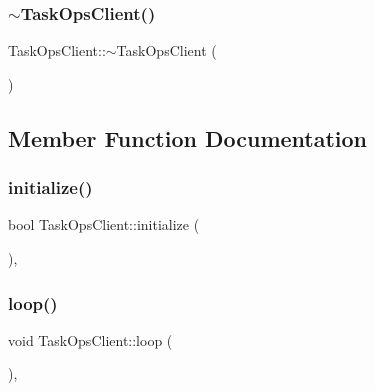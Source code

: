 \subsubsection{\texorpdfstring{$\sim$\+Task\+Ops\+Client()}{~TaskOpsClient()}}
{\footnotesize\ttfamily Task\+Ops\+Client\+::$\sim$\+Task\+Ops\+Client (\begin{DoxyParamCaption}{ }\end{DoxyParamCaption})\hspace{0.3cm}{\ttfamily [virtual]}}



\subsection{Member Function Documentation}
\hypertarget{classTaskOpsClient_a6f5e4c20c1d5f5df28dcc58e3cb4adb0}{}\label{classTaskOpsClient_a6f5e4c20c1d5f5df28dcc58e3cb4adb0} 
\subsubsection{\texorpdfstring{initialize()}{initialize()}}
{\footnotesize\ttfamily bool Task\+Ops\+Client\+::initialize (\begin{DoxyParamCaption}{ }\end{DoxyParamCaption})\hspace{0.3cm}{\ttfamily [protected]}, {\ttfamily [virtual]}}

\hypertarget{classTaskOpsClient_a7e7dfab7af0404f0b008da2844ab573e}{}\label{classTaskOpsClient_a7e7dfab7af0404f0b008da2844ab573e} 
\subsubsection{\texorpdfstring{loop()}{loop()}}
{\footnotesize\ttfamily void Task\+Ops\+Client\+::loop (\begin{DoxyParamCaption}{ }\end{DoxyParamCaption})\hspace{0.3cm}{\ttfamily [protected]}, {\ttfamily [virtual]}}

\hypertarget{classTaskOpsClient_af54d37bc4a2631c5c47e23d8156f6e95}{}\label{classTaskOpsClient_af54d37bc4a2631c5c47e23d8156f6e95} 
